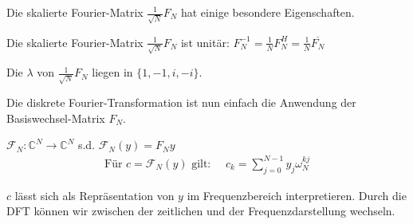 Die skalierte Fourier-Matrix $\frac{1}{\sqrt{N}}F_N$ hat einige besondere Eigenschaften.

\inlinetheorem Die skalierte Fourier-Matrix $\frac{1}{\sqrt{N}}F_N$ ist unitär: $F_N^{-1} = \frac{1}{N} F_N^H = \frac{1}{N} \overline{F_N}$

 Die $\lambda$ von $\frac{1}{\sqrt{N}}F_N$ liegen in $\{1,-1,i,-i\}$.

Die diskrete Fourier-Transformation ist nun einfach die Anwendung der Basiswechsel-Matrix $F_N$.

 $\mathcal{F}_N: \mathbb{C}^N \to \mathbb{C}^N$ s.d. $\mathcal{F}_N(y) = F_Ny$
\begin{align*}
    \text{Für } c = \mathcal{F}_N(y) \text{ gilt: }\quad c_k = \sum_{j=0}^{N-1} y_j \omega_N^{kj}
\end{align*}

$c$ lässt sich als Repräsentation von $y$ im Frequenzbereich interpretieren. Durch die DFT können wir zwischen der zeitlichen und der Frequenzdarstellung wechseln.
